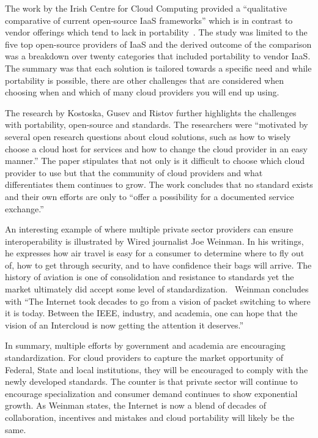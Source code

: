 The work by the Irish Centre for Cloud Computing provided a ``qualitative  comparative  
of current  open-source  IaaS frameworks'' which is in contrast to vendor offerings which
tend to lack in portability~\cite{hid-sp18-518-Comp-study}. The study was limited to the
five top open-source providers of IaaS and the derived outcome of the comparison was a 
breakdown over twenty categories that included portability to vendor IaaS. The summary
was that each solution is tailored towards a specific need and while portability is
possible, there are other challenges that are considered when choosing when and which
of many cloud providers you will end up using.

The research by Kostoska, Gusev and Ristov further highlights the challenges with 
portability, open-source and standards. The researchers were ``motivated by several open 
research questions about cloud solutions, such as how to wisely choose a cloud host for 
services and how to change the cloud provider in an easy manner.''\cite{hid-sp18-518-
Kostoska-Gusev-Ristov} The paper stipulates that not only is it difficult to choose
which cloud provider to use but that the community of cloud providers and what 
differentiates them continues to grow. The work concludes that no standard exists and 
their own efforts are only to ``offer a possibility for a documented service exchange.''

An interesting example of where multiple private sector providers can ensure 
interoperability is illustrated by Wired journalist Joe Weinman. In his writings, he
expresses how air travel is easy for a consumer to determine where to fly out of, how
to get through security, and to have confidence their bags will arrive. The history of
aviation is one of consolidation and resistance to standards yet the market ultimately 
did accept some level of standardization.~\cite{hid-sp18-518-Wired} Weinman concludes 
with ``The Internet took decades to go from a vision of packet switching to where it is 
today.  Between the IEEE, industry, and academia, one can hope that the vision of an 
Intercloud is now getting the attention it deserves.''

In summary, multiple efforts by government and academia are encouraging standardization. 
For cloud providers to capture the market opportunity of Federal, State and local 
institutions, they will be encouraged to comply with the newly developed standards. The 
counter is that private sector will continue to encourage specialization and consumer
demand continues to show exponential growth. As Weinman states, the Internet is now a 
blend of decades of collaboration, incentives and mistakes and cloud portability will
likely be the same.

